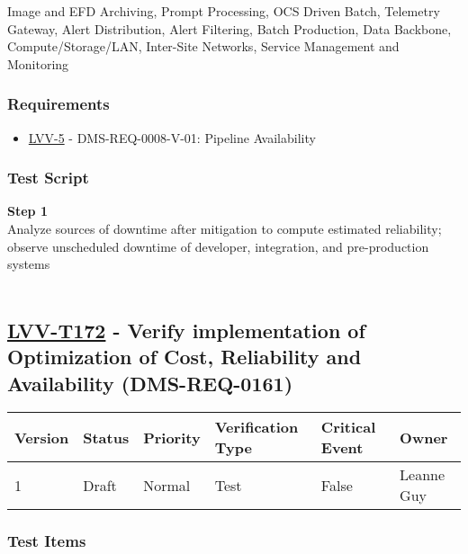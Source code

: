 Image and EFD Archiving, Prompt Processing, OCS Driven Batch, Telemetry
Gateway, Alert Distribution, Alert Filtering, Batch Production, Data
Backbone, Compute/Storage/LAN, Inter-Site Networks, Service Management
and Monitoring

\hypertarget{requirements-148}{%
\subsubsection{Requirements}\label{requirements-148}}

\begin{itemize}
\tightlist
\item
  \href{https://jira.lsstcorp.org/browse/LVV-5}{LVV-5} -
  DMS-REQ-0008-V-01: Pipeline Availability
\end{itemize}

\hypertarget{test-script-148}{%
\subsubsection{Test Script}\label{test-script-148}}

\textbf{Step 1}\\
Analyze sources of downtime after mitigation to compute estimated
reliability; observe unscheduled downtime of developer, integration, and
pre-production systems\\
~\\

\hypertarget{lvv-t172---verify-implementation-of-optimization-of-cost-reliability-and-availability-dms-req-0161}{%
\subsection{\texorpdfstring{\href{https://jira.lsstcorp.org/secure/Tests.jspa\#/testCase/LVV-T172}{LVV-T172}
- Verify implementation of Optimization of Cost, Reliability and
Availability
(DMS-REQ-0161)}{LVV-T172 - Verify implementation of Optimization of Cost, Reliability and Availability (DMS-REQ-0161)}}\label{lvv-t172---verify-implementation-of-optimization-of-cost-reliability-and-availability-dms-req-0161}}

\begin{longtable}[]{@{}llllll@{}}
\toprule
Version & Status & Priority & Verification Type & Critical Event &
Owner\tabularnewline
\midrule
\endhead
1 & Draft & Normal & Test & False & Leanne Guy\tabularnewline
\bottomrule
\end{longtable}

\hypertarget{test-items-148}{%
\subsubsection{Test Items}\label{test-items-148}}

